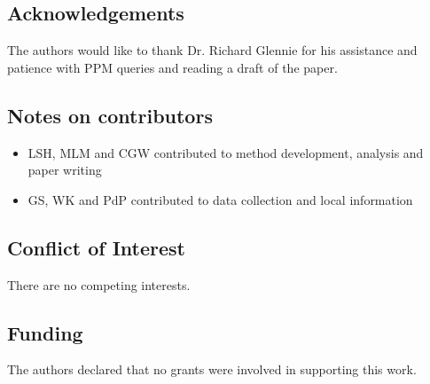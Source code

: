 \documentclass[letterpaper, 12pt]{interact}
\begin{document}
	\subsection*{Acknowledgements}
	The authors would like to thank Dr. Richard Glennie for his assistance and patience with PPM queries and reading a draft of the paper. 
	
	\subsection*{Notes on contributors}
	\begin{itemize}
		\item LSH, MLM and CGW contributed to method development, analysis and paper writing
		\item GS, WK and PdP contributed to data collection and local information
	\end{itemize}
	
	\subsection*{Conflict of Interest}
	
	There are no competing interests. 
	
	\subsection*{Funding}
	The authors declared that no grants were involved in supporting this work.
	
	
	
	
	{\small
		}
	
	
	\processdelayedfloats
	
	
	\bigskip
	
\end{document}
